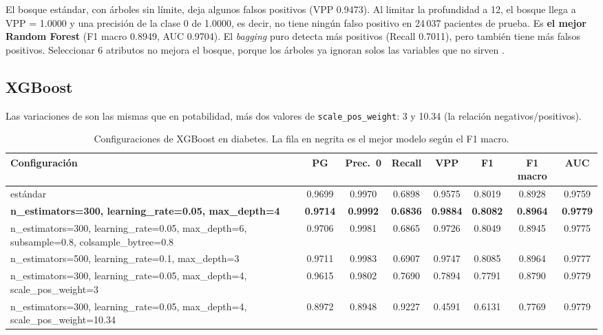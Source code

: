 \documentclass[11pt,a4paper]{article}
\let\citepOriginal\citep
\renewcommand*{\citep}[1]{\textbf{\citepOriginal{#1}}}%
\let\citetOriginal\citet
\renewcommand*{\citet}[1]{\textbf{\citetOriginal{#1}}}%
\begin{document}
El bosque estándar, con árboles sin límite, deja algunos falsos positivos (VPP 0.9473). Al limitar la profundidad a 12, el bosque llega a VPP = 1.0000 y una precisión de la clase 0 de 1.0000, es decir, no tiene ningún falso positivo en 24\,037 pacientes de prueba. Es \textbf{el mejor Random Forest} (F1 macro 0.8949, AUC 0.9704). El \textit{bagging} puro detecta más positivos (Recall 0.7011), pero también tiene más falsos positivos. Seleccionar 6 atributos no mejora el bosque, porque los árboles ya ignoran solos las variables que no sirven \citep{breiman2001}.

\subsection{XGBoost}
Las variaciones de \citet{chen2016} son las mismas que en potabilidad, más dos valores de \texttt{scale\_pos\_weight}: 3 y 10.34 (la relación negativos/positivos).

\begin{table}[H]
\centering
\small
\caption{Configuraciones de XGBoost en diabetes. La fila en negrita es el mejor modelo según el F1 macro.}
\setlength{\tabcolsep}{4pt}
\begin{tabular}{>{\raggedright\arraybackslash}p{4.9cm}ccccccc}
\toprule
Configuración & PG & Prec.\ 0 & Recall & VPP & F1 & F1 macro & AUC \\
\midrule
estándar & 0.9699 & 0.9970 & 0.6898 & 0.9575 & 0.8019 & 0.8928 & 0.9759 \\
\textbf{n\_estimators=\allowbreak{}300, \allowbreak learning\_rate=\allowbreak{}0.05, \allowbreak max\_depth=\allowbreak{}4} & \textbf{0.9714} & \textbf{0.9992} & \textbf{0.6836} & \textbf{0.9884} & \textbf{0.8082} & \textbf{0.8964} & \textbf{0.9779} \\
n\_estimators=\allowbreak{}300, \allowbreak learning\_rate=\allowbreak{}0.05, \allowbreak max\_depth=\allowbreak{}6, \allowbreak subsample=\allowbreak{}0.8, \allowbreak colsample\_bytree=\allowbreak{}0.8 & 0.9706 & 0.9981 & 0.6865 & 0.9726 & 0.8049 & 0.8945 & 0.9775 \\
n\_estimators=\allowbreak{}500, \allowbreak learning\_rate=\allowbreak{}0.1, \allowbreak max\_depth=\allowbreak{}3 & 0.9711 & 0.9983 & 0.6907 & 0.9747 & 0.8085 & 0.8964 & 0.9777 \\
n\_estimators=\allowbreak{}300, \allowbreak learning\_rate=\allowbreak{}0.05, \allowbreak max\_depth=\allowbreak{}4, \allowbreak scale\_pos\_weight=\allowbreak{}3 & 0.9615 & 0.9802 & 0.7690 & 0.7894 & 0.7791 & 0.8790 & 0.9779 \\
n\_estimators=\allowbreak{}300, \allowbreak learning\_rate=\allowbreak{}0.05, \allowbreak max\_depth=\allowbreak{}4, \allowbreak scale\_pos\_weight=\allowbreak{}10.34 & 0.8972 & 0.8948 & 0.9227 & 0.4591 & 0.6131 & 0.7769 & 0.9779 \\
\bottomrule
\end{tabular}
\end{table}
\end{document}
